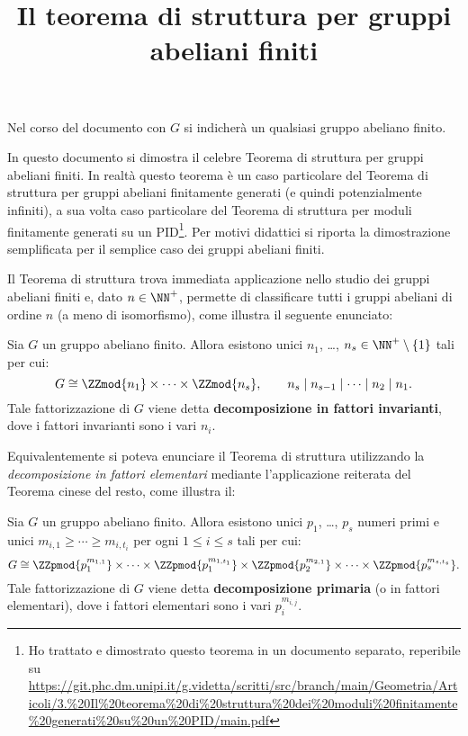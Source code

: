 \documentclass[12pt]{scrartcl}
\begin{document}
	\title{Il teorema di struttura per gruppi abeliani finiti}
	\maketitle
		
	\begin{note}
		Nel corso del documento con $G$ si indicherà un qualsiasi gruppo abeliano finito.
	\end{note}
	
	In questo documento si dimostra il celebre Teorema di
	struttura per gruppi abeliani finiti. In realtà questo
	teorema è un caso particolare del Teorema di struttura
	per gruppi abeliani finitamente generati (e quindi
	potenzialmente infiniti), a sua volta caso particolare
	del Teorema di struttura per moduli finitamente generati
	su un PID\footnote{
		Ho trattato e dimostrato questo teorema in un documento
		separato, reperibile su
		\url{https://git.phc.dm.unipi.it/g.videtta/scritti/src/branch/main/Geometria/Articoli/3.\%20Il\%20teorema\%20di\%20struttura\%20dei\%20moduli\%20finitamente\%20generati\%20su\%20un\%20PID/main.pdf}
	}. Per motivi didattici si riporta la dimostrazione semplificata
	per il semplice caso dei gruppi abeliani finiti. \medskip
	
	
	Il Teorema di struttura trova immediata applicazione nello
	studio dei gruppi abeliani finiti e, dato $n \in \NN^+$, permette di classificare tutti i gruppi abeliani di ordine $n$ (a meno
	di isomorfismo), come illustra il seguente enunciato:
	
	\begin{theorem}
		Sia $G$ un gruppo abeliano finito. Allora esistono unici
		$n_1$, \ldots, $n_s \in \NN^+ \setminus \{1\}$ tali per cui:
		\[ G \cong \ZZmod{n_1} \times \cdots \times \ZZmod{n_s}, \qquad n_s \mid n_{s-1} \mid \cdots \mid n_2 \mid n_1. \]
		Tale fattorizzazione di $G$ viene detta
		\textbf{decomposizione in fattori invarianti}, dove
		i fattori invarianti sono i vari $n_i$.
	\end{theorem}
	
	Equivalentemente si poteva enunciare il Teorema di struttura
	utilizzando la \textit{decomposizione in fattori elementari}
	mediante l'applicazione reiterata del Teorema cinese del
	resto, come illustra il:
	
	\begin{theorem}
		Sia $G$ un gruppo abeliano finito. Allora esistono unici
		$p_1$, \ldots, $p_s$ numeri primi e unici $m_{i,1} \geq \cdots \geq m_{i,t_i}$ per ogni $1 \leq i \leq s$ tali per cui:
		\[ G \cong \ZZpmod{p_1^{m_{1,1}}} \times \cdots \times \ZZpmod{p_1^{m_{1,t_1}}} \times \ZZpmod{p_2^{m_{2,1}}} \times \cdots \times \ZZpmod{p_s^{m_{s,t_s}}}. \]
		Tale fattorizzazione di $G$ viene detta
		\textbf{decomposizione primaria} (o in fattori
		elementari), dove i fattori elementari sono i vari $p_i^{m_{i,j}}$.
	\end{theorem}
	
\end{document}
